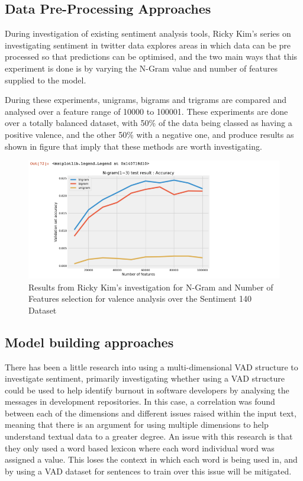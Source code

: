 \subsection{Data Pre-Processing Approaches}

During investigation of existing sentiment analysis tools, Ricky Kim's series on investigating sentiment in twitter data \cite{towardsDS} explores areas in which data can be pre processed so that predictions can be optimised, and the two main ways that this experiment is done is by varying the N-Gram value and number of features supplied to the model.


During these experiments, unigrams, bigrams and trigrams are compared and analysed over a feature range of 10000 to 100001. These experiments are done over a totally balanced dataset, with 50\% of the data being classed as having a positive valence, and the other 50\% with a negative one, and produce results as shown in figure that imply that these methods are worth investigating.


\begin{figure}[h]
\caption{Results from Ricky Kim's investigation for N-Gram and Number of Features selection for valence analysis over the Sentiment 140 Dataset \cite{go2016sentiment140}}
\centering
\includegraphics[scale=0.5]{litImgs/towardsDSNgramNFeatures.png}
\end{figure}


\subsection{Model building approaches}

There has been a little research into using a multi-dimensional VAD structure to investigate sentiment, primarily investigating whether using a VAD structure could be used to help identify burnout in software developers by analysing the messages in development repositories. \cite{mantyla2016mining} In this case, a correlation was found between each of the dimensions and different issues raised within the input text, meaning that there is an argument for using multiple dimensions to help understand textual data to a greater degree. An issue with this research is that they only used a word based lexicon where each word individual word was assigned a value. This loses the context in which each word is being used in, and by using a VAD dataset for sentences to train over this issue will be mitigated.


